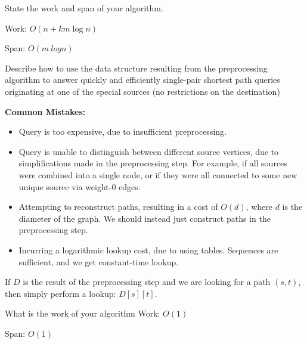 \begin{problem}
\ask[4]
State the work and span of your algorithm.


Work: 
\sol $O(n + km\log n)$

Span:
\sol $O(m\ log n)$


\ask[5]
Describe how to use the data structure resulting from the
preprocessing algorithm to answer quickly and efficiently single-pair
shortest path queries originating at one of the special sources (no
restrictions on the destination)

\notes
\textbf{Common Mistakes:}
\begin{itemize}
	\item Query is too expensive, due to insufficient preprocessing.
	\item Query is unable to distinguish between different source vertices, due
  to simplifications made in the preprocessing step. For example, if all
  sources were combined into a single node, or if they were all connected to
  some new unique source via weight-0 edges.
	\item Attempting to reconstruct paths, resulting in a cost of $O(d)$, where
  $d$ is the diameter of the graph. We should instead just construct paths in
  the preprocessing step.
	\item Incurring a logarithmic lookup cost, due to using tables. Sequences are
  sufficient, and we get constant-time lookup.
\end{itemize}

\sol
If $D$ is the result of the preprocessing step and we are looking for a path
$(s, t)$, then simply perform a lookup: $D[s][t]$.


\ask What is the work of your algorithm
Work: \sol $O(1)$

\ask Span: \sol$O(1)$


\end{problem}
















